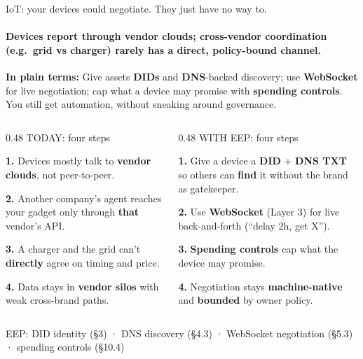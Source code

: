 \documentclass[aspectratio=169,10pt]{beamer}
\begin{document}
\begin{frame}{IoT: your devices could negotiate. They just have no way to.}
\framesubtitle{Devices report through vendor clouds; cross-vendor coordination (e.g.\ grid vs charger) rarely has a direct, policy-bound channel.}

\vspace{0.08cm}
{\small\color{amber}\textbf{In plain terms:}\; Give assets \textbf{DIDs} and \textbf{DNS}-backed discovery; use \textbf{WebSocket} for live negotiation; cap what a device may promise with \textbf{spending controls}. You still get automation, without sneaking around governance.}

\vspace{0.08cm}
\begin{columns}[T]
\begin{column}{0.48\textwidth}
{\small\color{rose} TODAY: four steps}\par
\vspace{2pt}
{\small\color{txtm}%
\textbf{1.}\; Devices mostly talk to \textbf{vendor clouds}, not peer-to-peer.\par
\textbf{2.}\; Another company's agent reaches your gadget only through \textbf{that} vendor's API.\par
\textbf{3.}\; A charger and the grid can't \textbf{directly} agree on timing and price.\par
\textbf{4.}\; Data stays in \textbf{vendor silos} with weak cross-brand paths.\par
}
\end{column}

\begin{column}{0.48\textwidth}
{\small\color{mint} WITH EEP: four steps}\par
\vspace{2pt}
{\small\color{txtm}%
\textbf{1.}\; Give a device a \textbf{DID} + \textbf{DNS TXT} so others can \textbf{find} it without the brand as gatekeeper.\par
\textbf{2.}\; Use \textbf{WebSocket} (Layer 3) for live back-and-forth (``delay 2h, get X'').\par
\textbf{3.}\; \textbf{Spending controls} cap what the device may promise.\par
\textbf{4.}\; Negotiation stays \textbf{machine-native} and \textbf{bounded} by owner policy.\par
}
\end{column}
\end{columns}

\vspace{4pt}
{\footnotesize\color{slate} EEP: DID identity (§3) · DNS discovery (§4.3) · WebSocket negotiation (§5.3) · spending controls (§10.4)}
\end{frame}
\end{document}
